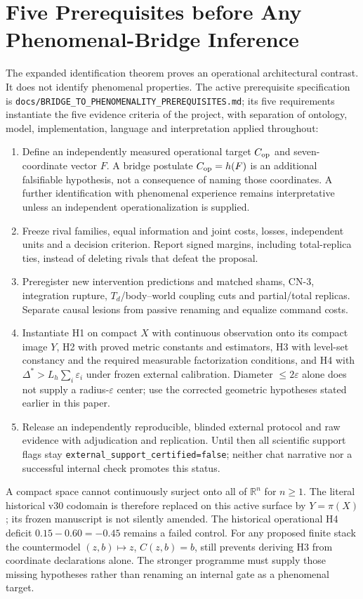 \documentclass[11pt,a4paper]{article}
\theoremstyle{definition}
\begin{document}
\section{Five Prerequisites before Any Phenomenal-Bridge Inference}
\label{sec:bridge-five-prerequisites}
The expanded identification theorem proves an operational architectural
contrast. It does not identify phenomenal properties. The active prerequisite
specification is \texttt{docs/BRIDGE\_TO\_PHENOMENALITY\_PREREQUISITES.md};
its five requirements instantiate the five evidence criteria of the project,
with separation of ontology, model, implementation, language and interpretation
applied throughout:
\begin{enumerate}[leftmargin=*]
\item Define an independently measured operational target $C_{\rm op}$ and
seven-coordinate vector $F$. A bridge postulate $C_{\rm op}=h(F)$ is an
additional falsifiable hypothesis, not a consequence of naming those
coordinates. A further identification with phenomenal experience remains
interpretative unless an independent operationalization is supplied.
\item Freeze rival families, equal information and joint costs, losses,
independent units and a decision criterion. Report signed margins, including
total-replica ties, instead of deleting rivals that defeat the proposal.
\item Preregister new intervention predictions and matched shams, CN-3,
integration rupture, $T_d$/body--world coupling cuts and partial/total replicas.
Separate causal lesions from passive renaming and equalize command costs.
\item Instantiate H1 on compact $X$ with continuous observation onto its
compact image $Y$, H2 with proved metric constants and estimators, H3 with
level-set constancy and the required measurable factorization conditions,
and H4 with $\Delta^*>L_h\sum_i\varepsilon_i$ under frozen external calibration.
Diameter $\le2\varepsilon$ alone does not supply a radius-$\varepsilon$
center; use the corrected geometric hypotheses stated earlier in this paper.
\item Release an independently reproducible, blinded external protocol and
raw evidence with adjudication and replication. Until then all scientific
support flags stay \texttt{external\_support\_certified=false}; neither chat
narrative nor a successful internal check promotes this status.
\end{enumerate}
A compact space cannot continuously surject onto all of $\mathbb R^n$ for
$n\ge1$. The literal historical v30 codomain is therefore replaced on this
active surface by $Y=\pi(X)$; its frozen manuscript is not silently amended.
The historical operational H4 deficit $0.15-0.60=-0.45$ remains a failed
control. For any proposed finite stack the countermodel $(z,b)\mapsto z$,
$C(z,b)=b$, still prevents deriving H3 from coordinate declarations alone.
The stronger programme must supply those missing hypotheses rather than
renaming an internal gate as a phenomenal target.
\end{document}
